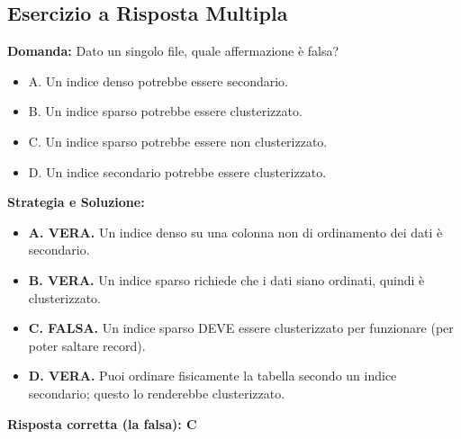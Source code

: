 \subsection{Esercizio a Risposta Multipla}
\textbf{Domanda:} Dato un singolo file, quale affermazione è falsa?
\begin{itemize}
    \item A. Un indice denso potrebbe essere secondario.
    \item B. Un indice sparso potrebbe essere clusterizzato.
    \item C. Un indice sparso potrebbe essere non clusterizzato.
    \item D. Un indice secondario potrebbe essere clusterizzato.
\end{itemize}
\textbf{Strategia e Soluzione:}
\begin{itemize}
    \item \textbf{A. VERA.} Un indice denso su una colonna non di ordinamento dei dati è secondario.
    \item \textbf{B. VERA.} Un indice sparso richiede che i dati siano ordinati, quindi è clusterizzato.
    \item \textbf{C. FALSA.} Un indice sparso DEVE essere clusterizzato per funzionare (per poter saltare record).
    \item \textbf{D. VERA.} Puoi ordinare fisicamente la tabella secondo un indice secondario; questo lo renderebbe clusterizzato.
\end{itemize}
\textbf{Risposta corretta (la falsa): C}

